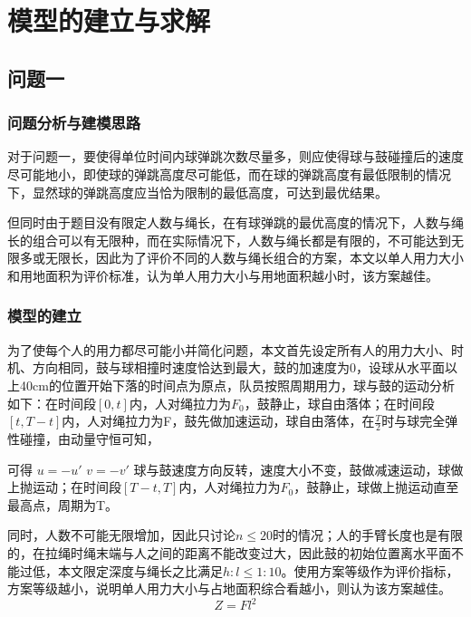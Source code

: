 \documentclass[withoutpreface,bwprint]{cumcmthesis} %
\begin{document}
\section{模型的建立与求解}

\subsection{问题一}
	\subsubsection{问题分析与建模思路}
对于问题一，要使得单位时间内球弹跳次数尽量多，则应使得球与鼓碰撞后的速度尽可能地小，即使球的弹跳高度尽可能低，而在球的弹跳高度有最低限制的情况下，显然球的弹跳高度应当恰为限制的最低高度，可达到最优结果。
\par
但同时由于题目没有限定人数与绳长，在有球弹跳的最优高度的情况下，人数与绳长的组合可以有无限种，而在实际情况下，人数与绳长都是有限的，不可能达到无限多或无限长，因此为了评价不同的人数与绳长组合的方案，本文以单人用力大小和用地面积为评价标准，认为单人用力大小与用地面积越小时，该方案越佳。

	\subsubsection{模型的建立}
为了使每个人的用力都尽可能小并简化问题，本文首先设定所有人的用力大小、时机、方向相同，鼓与球相撞时速度恰达到最大，鼓的加速度为0，设球从水平面以上40cm的位置开始下落的时间点为原点，队员按照周期用力，球与鼓的运动分析如下：在时间段$\left [ 0,t \right ]$内，人对绳拉力为$F_0$，鼓静止，球自由落体；在时间段$\left [ t,T-t \right ] $内，人对绳拉力为F，鼓先做加速运动，球自由落体，在$\frac{T}{2}$时与球完全弹性碰撞，由动量守恒可知，
%
%
%
%
%


可得 $u=-{u}'$ $v=-{v}'$ 球与鼓速度方向反转，速度大小不变，鼓做减速运动，球做上抛运动；在时间段$ \left [ T-t,T \right ]$内，人对绳拉力为$F_0$，鼓静止，球做上抛运动直至最高点，周期为T。
%
%
%
%
\par
同时，人数不可能无限增加，因此只讨论$n\leq 20$时的情况；人的手臂长度也是有限的，在拉绳时绳末端与人之间的距离不能改变过大，因此鼓的初始位置离水平面不能过低，本文限定深度与绳长之比满足$h:l\leq 1:10$。使用方案等级作为评价指标，方案等级越小，说明单人用力大小与占地面积综合看越小，则认为该方案越佳。
\begin{equation}
Z=Fl^2
\end{equation}
\end{document}
